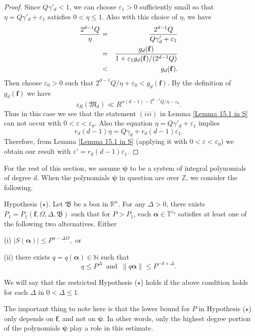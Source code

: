 \documentclass[12pt]{amsart}
\theoremstyle{definition}
\theoremstyle{remark}
\numberwithin{equation}{section}
\begin{document}
\begin{proof}
Since $ Q \gamma'_d < 1$, we can choose $\varepsilon_1 > 0$ sufficiently small so that
$\eta = Q \gamma'_d + \varepsilon_1$ satisfies $0 < \eta \leq 1$.
Also with this choice of $\eta$, we have
\begin{eqnarray}
\frac{2^{d-1} Q} { \eta} &=& \frac{ 2^{d-1} Q}{ Q \gamma'_d + \varepsilon_1 }
\notag
\\
&=& \frac{ g_d( \mathbf{f} )}{ 1+ \varepsilon_1 g_d(\mathbf{f} ) / ( 2^{d-1} Q  ) }
\notag
\\
&<& g_d( \mathbf{f} ).
\notag
\end{eqnarray}
Then choose $\varepsilon_0 > 0$ such that $2^{d-1}Q / \eta + \varepsilon_0 < g_d( \mathbf{f} )$. By the definition of $g_d( \mathbf{f} )$ we have
$$
z_R(\mathfrak{M}_d) \ll R^{n(d-1) - 2^{d-1}Q / \eta - \varepsilon_0}.
$$
Thus in this case we see that the statement $(iii)$ in Lemma \ref{Lemma 15.1 in S}
can not occur with $0 < \varepsilon < \varepsilon_0$.
Also the equation $\eta = Q \gamma'_d + \varepsilon_1$ implies
$$
r_d (d-1) \eta = Q \gamma_d +  r_d (d-1) \varepsilon_1.
$$
Therefore, from Lemma \ref{Lemma 15.1 in S} (applying it with $0 < \varepsilon < \varepsilon_0$) we obtain our result with
$\varepsilon' = r_d (d-1) \varepsilon_1$.
\end{proof}

For the rest of this section, we assume $\boldsymbol{\psi}$ to be a system of integral polynomials of degree $d$.
When the polynomials $\boldsymbol{\psi}$ in question are over $\mathbb{Z}$, we consider the following.

Hypothesis ($\star$). Let $\mathfrak{B}$ be a box in $\mathbb{R}^n$. For any $\Delta > 0$,
there exists $P_1 = P_1(\mathbf{f}, \Omega,  \Delta, \mathfrak{B})$ such that for $P > P_1$,
each $\boldsymbol{\alpha} \in \mathbb{T}^{r_d}$ satisfies at least one of the following two alternatives. Either

(i)  $|S (\boldsymbol{\alpha}) | \leq P^{n - \Delta \Omega},$ or

(ii) there exists  $q = q(\boldsymbol{\alpha}) \in \mathbb{N}$ such that  
$$
q \leq P^{\Delta} \  \text{  and  } \  \|  q \boldsymbol{\alpha}  \| \leq P^{-d + \Delta}. 
$$

We will say that the restricted Hypothesis ($\star$) holds if the above condition holds for each $\Delta$ in $0 < \Delta \leq 1$.

The important thing to note here is that the lower bound for $P$ in Hypothesis ($\star$) only depends on $\mathbf{f}$, and not on $\boldsymbol{\psi}$. In other words, only the highest degree portion of the polynomials $\boldsymbol{\psi}$ play a role in this estimate.
\end{document}
